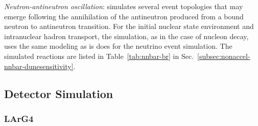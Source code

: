 \textit{Neutron-antineutron oscillation}:  simulates several event topologies that may emerge following the annihilation of the antineutron produced from a bound neutron to antineutron transition. For the initial nuclear state environment and intranuclear hadron transport, the simulation, as in the case of nucleon decay, uses the same modeling as  is does for the neutrino event simulation. The simulated reactions are listed in Table~\ref{tab:nnbar-br} in 
Sec.~\ref{subsec:nonaccel-nnbar-dunesensitivity}.


\subsection{Detector Simulation}
\label{sec:tools-mc-detsim}


\subsubsection{LArG4}\label{sec:larg4}

